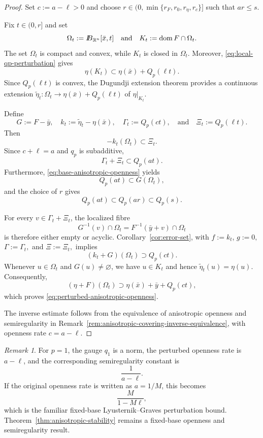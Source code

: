 \documentclass[11pt]{amsart}
\theoremstyle{definition}
\theoremstyle{remark}
\newtheorem{remark}[theorem]{Remark}
\newcommand{\bx}{\bar x}
\newcommand{\by}{\bar y}
\newcommand{\R}{\mathbb R}
\newcommand{\domm}{\mathop{\rm dom}\nolimits}
\def\ball{{I\kern -.35em B}}
\begin{document}
	\begin{proof}
		Set $c:=a-\ell>0$ and choose
		$r\in(0,\min\{r_F,r_0,r_\eta,r_c\}]$ such that $a r\le s$.
		
		Fix $t\in(0,r]$ and set
		$$
		\Omega_t:=\ball_{\R^n}[\bx,t]\quad\text{and}\quad
		K_t:=\domm F\cap\Omega_t.
		$$
		The set $\Omega_t$ is compact and convex, while $K_t$ is closed in
		$\Omega_t$. Moreover, \eqref{eq:local-qp-perturbation} gives
		$$
		\eta(K_t)
		\subset
		\eta(\bx)+Q_p(\ell t).
		$$
		Since $Q_p(\ell t)$ is convex, the Dugundji extension theorem
		\cite{Dugundji} provides a continuous extension
		$\widetilde\eta_t:
		\Omega_t\longrightarrow\eta(\bx)+Q_p(\ell t)$
		of $\eta\vert_{K_t}$.
		
		Define
		$$
		G:=F-\by,
		\quad
		k_t:=\widetilde\eta_t-\eta(\bx),
		\quad
		\Gamma_t:=Q_p(ct),
		\quad\text{and}\quad
		\Xi_t:=Q_p(\ell t).
		$$
		Then
		$$
		-k_t(\Omega_t)\subset\Xi_t.
		$$
		Since $c+\ell=a$ and $q_p$ is subadditive,
		$$
		\Gamma_t+\Xi_t
		\subset Q_p(at).
		$$
		Furthermore, \eqref{eq:base-anisotropic-openness} yields
		$$
		Q_p(at)\subset G(\Omega_t),
		$$
		and the choice of $r$ gives
		$$
		Q_p(at)\subset Q_p(ar)\subset Q_p(s).
		$$
		
		For every $v\in\Gamma_t+\Xi_t$, the localized fibre
		$$
		G^{-1}(v)\cap\Omega_t
		=
		F^{-1}(\by+v)\cap\Omega_t
		$$
		is therefore either empty or acyclic. Corollary~\ref{cor:error-set}, with
		$f:=k_t$, $g:=0,$ $\Gamma:=\Gamma_t,$ and $\Xi:=\Xi_t,$
		implies
		$$
		(k_t+G)(\Omega_t)\supset Q_p(ct).
		$$
		Whenever $u\in\Omega_t$ and $G(u)\ne\varnothing$, we have $u\in K_t$ and hence
		$\widetilde\eta_t(u)=\eta(u)$. Consequently,
		$$
		(\eta+F)(\Omega_t)
		\supset
		\eta(\bx)+\by+Q_p(ct),
		$$
		which proves \eqref{eq:perturbed-anisotropic-openness}.
		
		The inverse estimate follows from the equivalence of anisotropic
		openness and semiregularity in
		Remark~\ref{rem:anisotropic-covering-inverse-equivalence}, with
		openness rate $c=a-\ell$.
	\end{proof}
	
	\begin{remark}
		For $p=1$, the gauge $q_1$ is a norm, the perturbed openness rate is
		$a-\ell$, and the corresponding semiregularity constant is
		$$
		\frac{1}{a-\ell}.
		$$
		If the original openness rate is written as $a=1/M$, this becomes
		$$
		\frac{M}{1-M\ell},
		$$
		which is the familiar fixed-base Lyusternik--Graves perturbation bound.
		Theorem~\ref{thm:anisotropic-stability} remains a fixed-base openness
		and semiregularity result.
	\end{remark}
	
\end{document}
